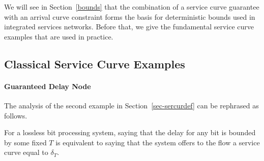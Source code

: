 We will see in Section~\ref{bounds} that the combination of a
service curve guarantee with an arrival curve constraint forms the
basis for deterministic bounds used in integrated services
networks. Before that, we give the fundamental service curve
examples that are used in practice.


\subsection{Classical Service Curve Examples}

\paragraph{Guaranteed Delay Node}
 The analysis of the second example
in Section~\ref{sec-sercurdef} can be rephrased as follows.
\begin{proposition}
    For a lossless bit processing system, saying that the delay
    for any bit is bounded by some fixed $T$ is equivalent to saying
    that the system offers to the flow a service curve equal to
    $\delta_{T}$.
\end{proposition}
